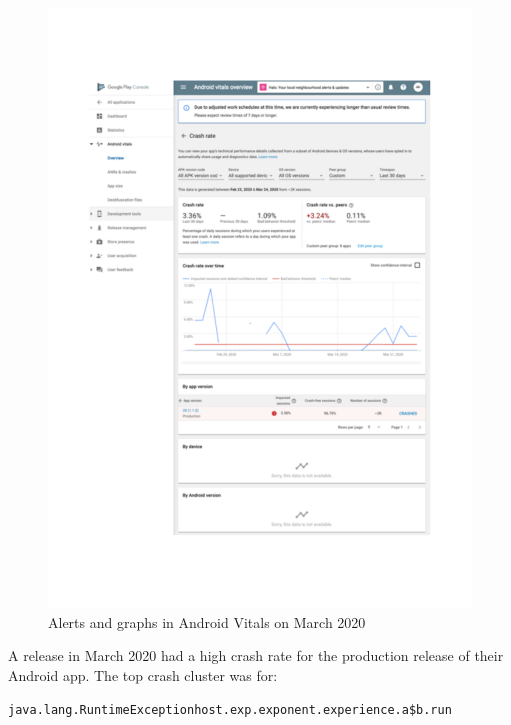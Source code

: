 \begin{figure}[htbp!]
\begin{minipage}{.45\linewidth}
\end{minipage}\hfill%
\begin{minipage}{.45\linewidth}
  \centering
  \includegraphics[width=\linewidth]{images/localhalo/apphealthdetailsplace_55505963_high_errors.pdf}
\end{minipage}
    \caption{Alerts and graphs in Android Vitals on  March 2020}
    \label{fig:localhalo-android-vitals-high-failures-26-march-2020}
\end{figure}

A release in March 2020 had a high crash rate for the production release of their Android app. The top crash cluster was for:

{\small \texttt{java.lang.RuntimeExceptionhost.exp.exponent.experience.a\$b.run}} 

